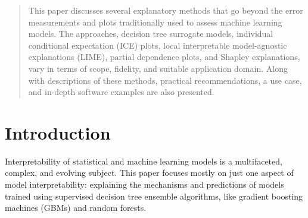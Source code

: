 \documentclass{article}
\begin{document}
 


\begin{abstract} 
	
This paper discusses several explanatory methods that go beyond the error measurements and plots 			traditionally used to assess machine learning models. The approaches, decision tree surrogate models, individual conditional expectation (ICE) plots, local interpretable model-agnostic explanations (LIME), partial dependence plots, and Shapley explanations, vary in terms of scope, fidelity, and suitable application domain. Along with descriptions of these methods, practical recommendations, a use case, and in-depth software examples are also presented.

\end{abstract} 

\section{Introduction}

Interpretability of statistical and machine learning models is a multifaceted, complex, and evolving subject. This paper focuses mostly on just one aspect of model interpretability: explaining the mechanisms and predictions of models trained using supervised decision tree ensemble algorithms, like gradient boosting machines (GBMs) and random forests. 
\end{document}
